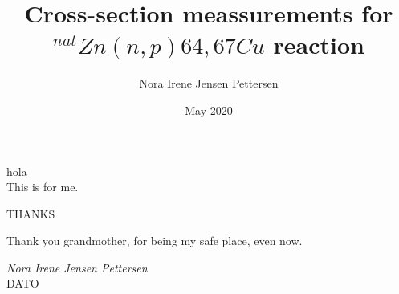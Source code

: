 \documentclass[twoside,english]{uiofysmaster/uiofysmaster}
\author{Nora Irene Jensen Pettersen}
\title{Cross-section meassurements for  $^{nat}Zn(n,p)64,67Cu$ reaction
}
\date{May 2020}
\begin{document}
\setlength{\belowdisplayskip}{12pt} \setlength{\belowdisplayshortskip}{12pt}
\setlength{\abovedisplayskip}{12pt} \setlength{\abovedisplayshortskip}{12pt}

\maketitle


\begin{abstract}




\end{abstract}

\begin{dedication}
  hola
  \\\vspace{12pt}
This is for me.     %
    
  

  
\end{dedication}

\begin{acknowledgements}
THANKS


Thank you grandmother, for being my safe place, even now. 
  \vspace{1.5cm}
  
  \noindent\textit{Nora Irene Jensen Pettersen}\\
  
  \noindent DATO
  
\end{acknowledgements}

\tableofcontents


\end{document}
